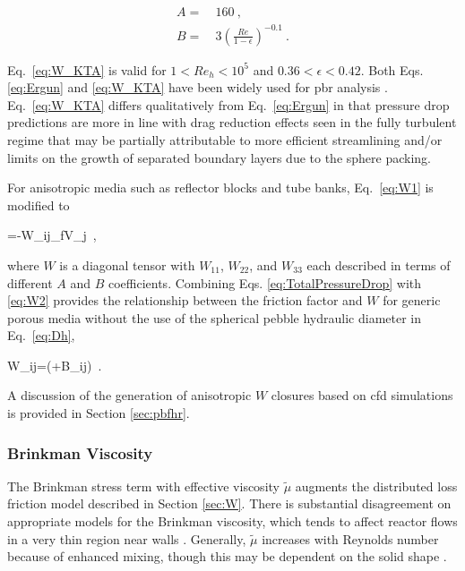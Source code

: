 \begin{subequations}
\label{eq:W_KTA}
\begin{align}
A=&\ 160\ ,\\
B=&\ 3\left(\frac{Re}{1-\epsilon}\right)^{-0.1}\ .
\end{align}
\end{subequations}

\noindent Eq.\ \eqref{eq:W_KTA} is valid for \(1<Re_h<10^5\) and \(0.36<\epsilon<0.42\). Both Eqs. \eqref{eq:Ergun} and \eqref{eq:W_KTA} have been widely used for \gls{pbr} analysis \cite{gao, becker, becker2003, auwerda_2011,kececioglu,avigni,suikkanen,ge,scarlat,y_li,cai}. Eq.\ \eqref{eq:W_KTA} differs qualitatively from Eq.\ \eqref{eq:Ergun} in that pressure drop predictions are more in line with drag reduction effects seen in the fully turbulent regime \cite{fand,kececioglu,KTA,barree,nield_2000} that may be partially attributable to more efficient streamlining and/or limits on the growth of separated boundary layers due to the sphere packing.

For anisotropic media such as reflector blocks and tube banks, Eq.\ \eqref{eq:W1} is modified to

\beq
\label{eq:W2}
\epsilon{}=-W_{ij}\rho_fV_j\ ,
\eeq

\noindent where \(W\) is a diagonal tensor with \(W_{11}\), \(W_{22}\), and \(W_{33}\) each described in terms of different \(A\) and \(B\) coefficients. Combining Eqs. \eqref{eq:TotalPressureDrop} with \eqref{eq:W2} provides the relationship between the friction factor and \(W\) for generic porous media without the use of the spherical pebble hydraulic diameter in Eq.\ \eqref{eq:Dh},

\beq
\label{eq:W3}
W_{ij}=\left(+B_{ij}\right)\ .
\eeq

\noindent A discussion of the generation of anisotropic \(W\) closures based on \gls{cfd} simulations is provided in Section \ref{sec:pbfhr}. 

\subsubsection{Brinkman Viscosity}
\label{sec:BrinkmanMu}

The Brinkman stress term with effective viscosity \(\tilde{\mu}\) augments the distributed loss friction model described in Section \ref{sec:W}. There is substantial disagreement on appropriate models for the Brinkman viscosity, which tends to affect reactor flows in a very thin region near walls \cite{auwerda_2011,giese,vafai,tecdoc1163}. Generally, \(\tilde{\mu}\) increases with Reynolds number because of enhanced mixing, though this may be dependent on the solid shape \cite{giese}. 

